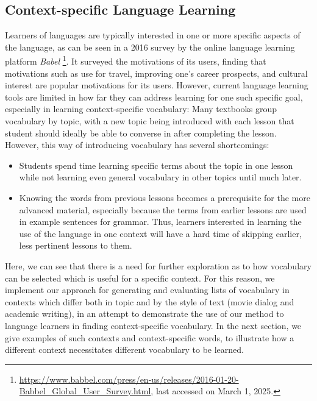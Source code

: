 \subsection{Context-specific Language Learning}
Learners of languages are typically interested in one or more specific aspects of the language, as can be seen in a 2016 survey by the online language learning platform \textit{Babel} \footnote{\url{https://www.babbel.com/press/en-us/releases/2016-01-20-Babbel_Global_User_Survey.html}, last accessed on March 1, 2025.}.
It surveyed the motivations of its users, finding that motivations such as use for travel, improving one's career prospects, and cultural interest are popular motivations for its users.
However, current language learning tools are limited in how far they can address learning for one such specific goal, especially in learning context-specific vocabulary:
Many textbooks group vocabulary by topic, with a new topic being introduced with each lesson that student should ideally be able to converse in after completing the lesson.
However, this way of introducing vocabulary has several shortcomings:
\begin{itemize}
	\item Students spend time learning specific terms about the topic in one lesson while not learning even general vocabulary in other topics until much later.
	\item Knowing the words from previous lessons becomes a prerequisite for the more advanced material, especially because the terms from earlier lessons are used in example sentences for grammar.
	      Thus, learners interested in learning the use of the language in one context will have a hard time of skipping earlier, less pertinent lessons to them.
\end{itemize}

Here, we can see that there is a need for further exploration as to how vocabulary can be selected which is useful for a specific context.
For this reason, we implement our approach for generating and evaluating lists of vocabulary in contexts which differ both in topic and by the style of text (movie dialog and academic writing), in an attempt to demonstrate the use of our method to language learners in finding context-specific vocabulary.
In the next section, we give examples of such contexts and context-specific words, to illustrate how a different context necessitates different vocabulary to be learned.


